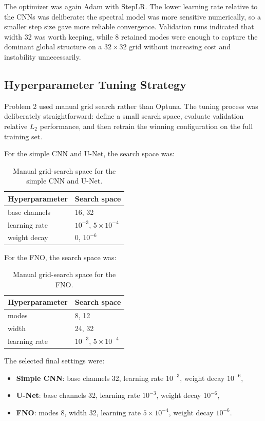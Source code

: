 \documentclass[11pt]{article}
\begin{document}
The optimizer was again Adam with StepLR. The lower learning rate relative to the CNNs was deliberate: the spectral model was more sensitive numerically, so a smaller step size gave more reliable convergence. Validation runs indicated that width 32 was worth keeping, while 8 retained modes were enough to capture the dominant global structure on a \(32\times32\) grid without increasing cost and instability unnecessarily.

\subsection*{Hyperparameter Tuning Strategy}

Problem 2 used manual grid search rather than Optuna. The tuning process was deliberately straightforward: define a small search space, evaluate validation relative \(L_2\) performance, and then retrain the winning configuration on the full training set.

For the simple CNN and U-Net, the search space was:

\begin{table}[H]
\centering
\begin{tabular}{ll}
\toprule
Hyperparameter & Search space \\
\midrule
base channels & 16, 32 \\
learning rate & \(10^{-3}\), \(5\times10^{-4}\) \\
weight decay & 0, \(10^{-6}\) \\
\bottomrule
\end{tabular}
\caption{Manual grid-search space for the simple CNN and U-Net.}
\end{table}

For the FNO, the search space was:

\begin{table}[H]
\centering
\begin{tabular}{ll}
\toprule
Hyperparameter & Search space \\
\midrule
modes & 8, 12 \\
width & 24, 32 \\
learning rate & \(10^{-3}\), \(5\times10^{-4}\) \\
\bottomrule
\end{tabular}
\caption{Manual grid-search space for the FNO.}
\end{table}

The selected final settings were:
\begin{itemize}[itemsep=0.25em]
    \item \textbf{Simple CNN}: base channels 32, learning rate \(10^{-3}\), weight decay \(10^{-6}\),
    \item \textbf{U-Net}: base channels 32, learning rate \(10^{-3}\), weight decay \(10^{-6}\),
    \item \textbf{FNO}: modes 8, width 32, learning rate \(5\times10^{-4}\), weight decay \(10^{-6}\).
\end{itemize}
\end{document}
